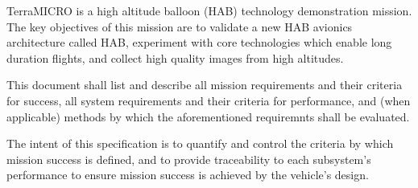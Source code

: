 TerraMICRO is a high altitude balloon (HAB) technology demonstration mission.
The key objectives of this mission are to validate a new HAB avionics 
architecture called \textmu HAB, experiment with core technologies which enable 
long duration flights, and collect high quality images from high altitudes.
    
This document shall list and describe all mission requirements and their 
criteria for success, all system requirements and their criteria for 
performance, and (when applicable) methods by which the aforementioned 
requiremnts shall be evaluated.

The intent of this specification is to quantify and control the criteria
by which mission success is defined, and to provide traceability to each
subsystem's performance to ensure mission success is achieved by the 
vehicle's design.